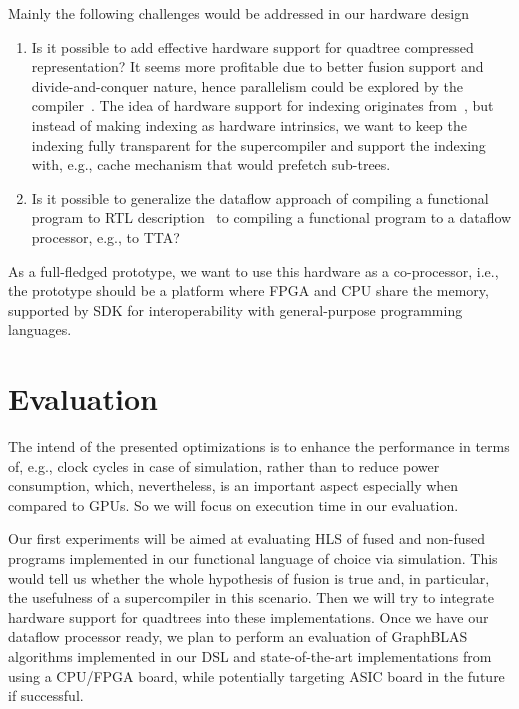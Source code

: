 \documentclass[sigplan,review,anonymous,nonacm]{acmart}\settopmatter{printfolios=true,printccs=false,printacmref=false}
\begin{document}
Mainly the following challenges would be addressed in our hardware design
\begin{enumerate}
    \item Is it possible to add effective hardware support for quadtree compressed representation? It seems more profitable due to better fusion support and divide-and-conquer nature, hence parallelism could be explored by the compiler~\cite{funcHLS}.
     The idea of hardware support for indexing originates from~\cite{smash}, but instead of making indexing as hardware intrinsics, we want to keep the indexing fully transparent for the supercompiler
     and support the indexing with, e.g., cache mechanism that would prefetch sub-trees.
     \item Is it possible to generalize the dataflow approach of compiling a functional program to RTL description~\cite{funcHLS} to compiling a functional program to a dataflow processor, e.g., to TTA? 
\end{enumerate}
As a full-fledged prototype, we want to use this hardware as a co-processor, i.e., the prototype should be a platform where FPGA and CPU share the memory, supported by SDK for interoperability with general-purpose programming languages.
\section{Evaluation}
The intend of the presented optimizations is to enhance the performance in terms of, e.g., clock cycles in case of simulation, rather than to reduce power consumption, which, nevertheless, is an important aspect especially when compared to GPUs. 
So we will focus on execution time in our evaluation.

Our first experiments will be aimed at evaluating HLS of fused and non-fused programs implemented in our functional language of choice via simulation. This would tell us whether the whole hypothesis of fusion is true and, in particular, the usefulness of a supercompiler in this scenario.
Then we will try to integrate hardware support for quadtrees into these implementations. %
Once we have our dataflow processor ready, we plan to perform an evaluation of GraphBLAS algorithms implemented in our DSL and state-of-the-art implementations from~\cite{yang2020graphblast,LaGRAPH} using a CPU/FPGA board, while potentially targeting ASIC board in the future if successful.




\end{document}
